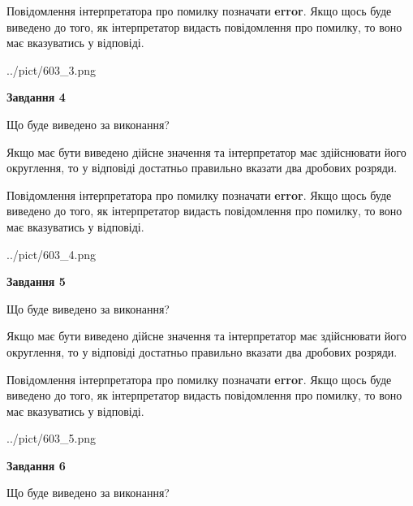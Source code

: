 \documentclass[12pt, ukrainian]{article}
\begin{document}
{\begin {Large}
Повідомлення інтерпретатора про помилку позначати \textbf{error}.
Якщо щось буде виведено до того, як інтерпретатор видасть повідомлення про помилку, 
то воно має вказуватись у відповіді. \par

\begin{center}
	{../pict/603_3.png}
\end{center}
\newpage

{\begin {center}\textbf{Завдання 4}\end {center}}\par
Що буде виведено за виконання? \par

Якщо має бути виведено дійсне значення та інтерпретатор має здійснювати його округлення, 
то у відповіді достатньо правильно вказати два дробових розряди.

Повідомлення інтерпретатора про помилку позначати \textbf{error}.
Якщо щось буде виведено до того, як інтерпретатор видасть повідомлення про помилку, 
то воно має вказуватись у відповіді. \par

\begin{center}
	{../pict/603_4.png}
\end{center}
\newpage

{\begin {center}\textbf{Завдання 5}\end {center}}\par
Що буде виведено за виконання? \par

Якщо має бути виведено дійсне значення та інтерпретатор має здійснювати його округлення, 
то у відповіді достатньо правильно вказати два дробових розряди.

Повідомлення інтерпретатора про помилку позначати \textbf{error}.
Якщо щось буде виведено до того, як інтерпретатор видасть повідомлення про помилку, 
то воно має вказуватись у відповіді. \par

\begin{center}
	{../pict/603_5.png}
\end{center}
\newpage

{\begin {center}\textbf{Завдання 6}\end {center}}\par
Що буде виведено за виконання? \par


\end{Large}}
\end{document}
